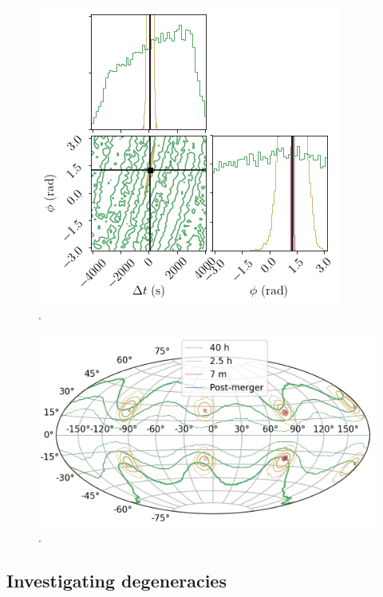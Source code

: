 \documentclass[aps,showpacs,twocolumn,prd,superscriptaddress,nofootinbib]{revtex4-1}
\begin{document}
\begin{figure}
\begin{minipage}{.32\linewidth}
   \end{minipage}
   \begin{minipage}{.32\linewidth}
      \includegraphics[width=.99\linewidth]{../plots/corner_smbh_case9_hm_tseries_tphi.png}
   \end{minipage}
  \caption{.}
  \label{fig:smbhCornerZoomHMCase9}
\end{figure}

\begin{figure}
  \centering
  \includegraphics[width=.8\linewidth]{../plots/plot_mollweide_tseries.png}
  \caption{.}
  \label{fig:MollweidesmbhTserieshmCase9}
\end{figure}


\subsection{Investigating degeneracies}
\label{sec:SMBHPEdegen}
\end{document}
